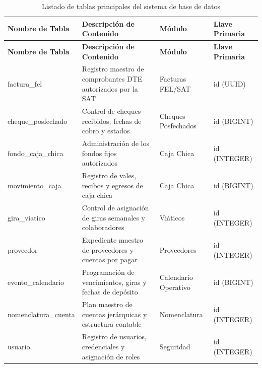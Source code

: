 {
\small
{}
\setlength{\parindent}{0pt}
\begin{xltabular}{\linewidth}{
    >{\raggedright\arraybackslash}p{3.2cm} 
    >{\raggedright\arraybackslash}X 
    >{\raggedright\arraybackslash}p{2.8cm} 
    >{\raggedright\arraybackslash}p{2.5cm}
}
    \caption{Listado de tablas principales del sistema de base de datos} \label{tab:cap4_bd_tablas} \\
    \toprule
    \textbf{Nombre de Tabla} & \textbf{Descripción de Contenido} & \textbf{Módulo} & \textbf{Llave Primaria} \\
    \midrule
    \endfirsthead

    \toprule
    \textbf{Nombre de Tabla} & \textbf{Descripción de Contenido} & \textbf{Módulo} & \textbf{Llave Primaria} \\
    \midrule
    \endhead

    \endfoot
\bottomrule
\endlastfoot

    \textrm{factura\_fel} & Registro maestro de comprobantes DTE autorizados por la SAT & Facturas FEL/SAT & \textrm{id} (UUID) \\
    \addlinespace
    \textrm{cheque\_posfechado} & Control de cheques recibidos, fechas de cobro y estados & Cheques Posfechados & \textrm{id} (BIGINT) \\
    \addlinespace
    \textrm{fondo\_caja\_chica} & Administración de los fondos fijos autorizados & Caja Chica & \textrm{id} (INTEGER) \\
    \addlinespace
    \textrm{movimiento\_caja} & Registro de vales, recibos y egresos de caja chica & Caja Chica & \textrm{id} (BIGINT) \\
    \addlinespace
    \textrm{gira\_viatico} & Control de asignación de giras semanales y colaboradores & Viáticos & \textrm{id} (INTEGER) \\
    \addlinespace
    \textrm{proveedor} & Expediente maestro de proveedores y cuentas por pagar & Proveedores & \textrm{id} (INTEGER) \\
    \addlinespace
    \textrm{evento\_calendario} & Programación de vencimientos, giras y fechas de depósito & Calendario Operativo & \textrm{id} (BIGINT) \\
    \addlinespace
    \textrm{nomenclatura\_cuenta} & Plan maestro de cuentas jerárquicas y estructura contable & Nomenclatura & \textrm{id} (INTEGER) \\
    \addlinespace
    \textrm{usuario} & Registro de usuarios, credenciales y asignación de roles & Seguridad & \textrm{id} (INTEGER) \\
\end{xltabular}
}

